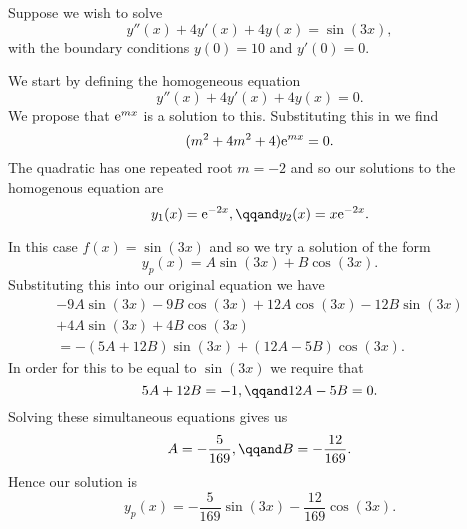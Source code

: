 \begin{exm}{}{}
    Suppose we wish to solve
    \begin{equation}
        y''(x) + 4y'(x) + 4y(x) = \sin(3x),
    \end{equation}
    with the boundary conditions \(y(0) = 10\) and \(y'(0) = 0\).
    
    We start by defining the homogeneous equation
    \begin{equation}
        y''(x) + 4y'(x) + 4y(x) = 0.
    \end{equation}
    We propose that \(\mathrm{e}^{mx}\) is a solution to this.
    Substituting this in we find
    \begin{equation}
        (m^2 + 4m^2 + 4)\mathrm{e}^{mx} = 0.
    \end{equation}
    The quadratic has one repeated root \(m = -2\) and so our solutions to the homogenous equation are
    \begin{equation}
        y_1(x) = \e^{-2x}, \qqand y_2(x) = x\e^{-2x}.
    \end{equation}
    
    In this case \(f(x) = \sin(3x)\) and so we try a solution of the form
    \begin{equation}
        y_p(x) = A\sin(3x) + B\cos(3x).
    \end{equation}
    Substituting this into our original equation we have
    \begin{multline}
        -9A\sin(3x) -9B\cos(3x) + 12A\cos(3x) - 12B\sin(3x)\\ + 4A\sin(3x) + 4B\cos(3x)\\= -(5A + 12B)\sin(3x) + (12A - 5B)\cos(3x).
    \end{multline}
    In order for this to be equal to \(\sin(3x)\) we require that
    \begin{equation}
        5A + 12B = -1, \qqand 12A - 5B = 0.
    \end{equation}
    Solving these simultaneous equations gives us
    \begin{equation}
        A = -\frac{5}{169}, \qqand B = -\frac{12}{169}.
    \end{equation}
    Hence our solution is
    \begin{equation}
        y_p(x) = -\frac{5}{169} \sin(3x) - \frac{12}{169} \cos(3x).
    \end{equation}
    

\end{exm}
